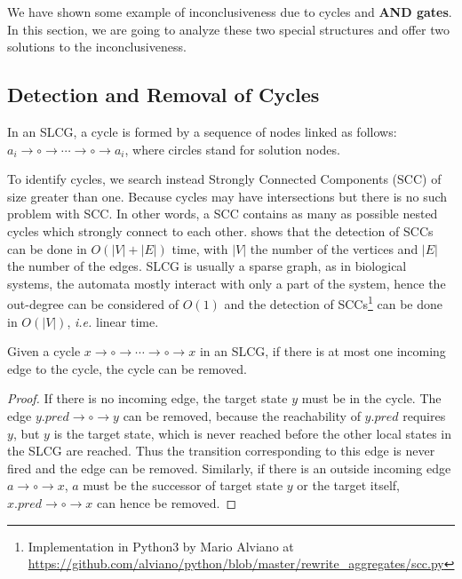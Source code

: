 We have shown some example of inconclusiveness due to cycles and \textbf{AND gates}. 
In this section, we are going to analyze these two special structures and offer two solutions to the inconclusiveness.

\subsection{Detection and Removal of Cycles}\label{sec:cycles}
\begin{definition}[Cycle]
In an SLCG, a cycle is formed by a sequence of nodes linked as follows: $a_i\to \circ \to \cdots \to \circ \to a_i$, where circles stand for solution nodes.
\end{definition}

To identify cycles, we search instead Strongly Connected Components (SCC) of size greater than one.
Because cycles may have intersections but there is no such problem with SCC.
In other words, a SCC contains as many as possible nested cycles which strongly connect to each other.
\cite{tarjan1972} shows that the detection of SCCs can be done in $O (|V|+|E|)$ time, with $|V|$ the number of the vertices and $|E|$ the number of the edges.
SLCG is usually a sparse graph, as in biological systems, the automata mostly interact with only a part of the system, hence the out-degree can be considered of $O (1)$ and the detection of SCCs\footnote{Implementation in Python3 by Mario Alviano at \url{https://github.com/alviano/python/blob/master/rewrite_aggregates/scc.py}} can be done in $O(|V|)$, \textit{i.e.} linear time.

\begin{theorem}\label{th:break_cycle}
Given a cycle $x\to \circ \to \cdots \to \circ \to x$ in an SLCG, if there is at most one incoming edge to the cycle, the cycle can be removed.
\end{theorem}

\begin{proof}
If there is no incoming edge, the target state $y$ must be in the cycle. 
The edge $y.pred\to\circ\to y$ can be removed, because the reachability of $y.pred$ requires $y$, but $y$ is the target state, which is never reached before the other local states in the SLCG are reached.
Thus the transition corresponding to this edge is never fired and the edge can be removed.
Similarly, if there is an outside incoming edge $a\to \circ \to x$, $a$ must be the successor of target state $y$ or the target itself, $x.pred\to\circ\to x$ can hence be removed.
\end{proof}

